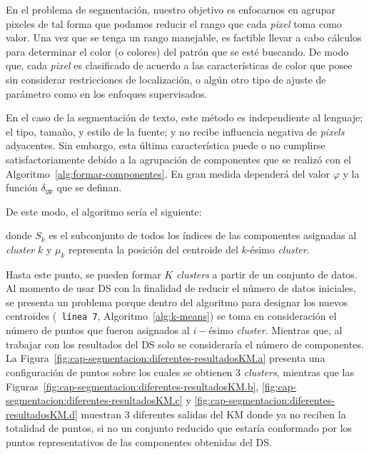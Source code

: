 En el problema de segmentación, nuestro objetivo es enfocarnos en agrupar 
pixeles de tal forma que podamos reducir el rango que cada \textit{pixel} toma 
como valor. Una vez que se tenga un rango manejable, es factible llevar a cabo 
cálculos para determinar el color (o colores) del patrón que se esté buscando. 
De modo que, cada \textit{pixel} es clasificado de acuerdo a las características 
de color que posee sin considerar restricciones de localización, o algún otro 
tipo de ajuste de parámetro como en los enfoques supervisados.

En el caso de la segmentación de texto, este método es independiente al 
lenguaje; el tipo, tamaño, y estilo de la fuente; y no recibe influencia 
negativa de \textit{pixels} adyacentes. Sin embargo, esta última característica
 puede o no cumplirse satisfactoriamente debido a la agrupación de componentes 
 que se realizó con el Algoritmo~\ref{alg:formar-componentes}. En gran medida 
 dependerá del valor $\varphi$ y la función $\delta_{\mathtt{UF}}$ que se 
 definan.

De este modo, el algoritmo sería el siguiente:

donde  $S_k$ es el subconjunto de todos los índices de las componentes asignadas
 al \textit{cluster} $k$ y $\mu_k$ representa la posición del centroide del 
 $k$-ésimo \textit{cluster}.

Hasta este punto, se pueden formar $K$ \textit{clusters} a partir de un conjunto 
de datos. Al momento de usar DS con la finalidad de reducir el número de datos 
iniciales, se presenta un problema porque dentro del algoritmo para designar los 
nuevos centroides (\texttt{\color{gray} línea 7}, Algoritmo~\ref{alg:k-means}) 
se toma en consideración el número de puntos que fueron asignados al $i-$ésimo 
\textit{cluster}. Mientras que, al trabajar con los resultados del DS solo se
 consideraría el número de componentes. La 
 Figura~\ref{fig:cap-segmentacion:diferentes-resultadosKM.a} presenta una 
 configuración de puntos sobre los cuales se obtienen 3 \textit{clusters},
  mientras que las Figuras~\ref{fig:cap-segmentacion:diferentes-resultadosKM.b}, 
  \ref{fig:cap-segmentacion:diferentes-resultadosKM.c} y 
  \ref{fig:cap-segmentacion:diferentes-resultadosKM.d} muestran 3 diferentes 
  salidas del KM donde ya no reciben la totalidad de puntos, si no un conjunto 
  reducido que estaría conformado por los puntos representativos de las 
  componentes obtenidas del DS.

